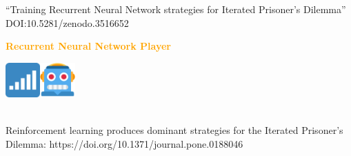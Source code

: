 \documentclass{beamer}
\begin{document}
\begin{frame}
    \begin{center}
        \large{``Training Recurrent Neural Network strategies for Iterated Prisoner's Dilemma''} \\ \vspace{.5cm}
        \footnotesize{DOI:10.5281/zenodo.3516652}
    \end{center}
\end{frame}
\begin{frame}
    \begin{center}
        \textcolor{orange}{\large{\textbf{Recurrent Neural Network Player}}} \vspace{1cm}
    
        \includegraphics[width=0.10\textwidth]{static/sequence.png}\hspace{2pt}\includegraphics[width=0.10\textwidth]{static/lstm.png}
    \end{center}
\end{frame}

\begin{frame}
    \begin{center}
     \\ \vspace{.5cm}
    \pause
    \small{Reinforcement learning produces dominant strategies for the Iterated Prisoner’s Dilemma: https://doi.org/10.1371/journal.pone.0188046}
    \end{center}
\end{frame}
\end{document}
